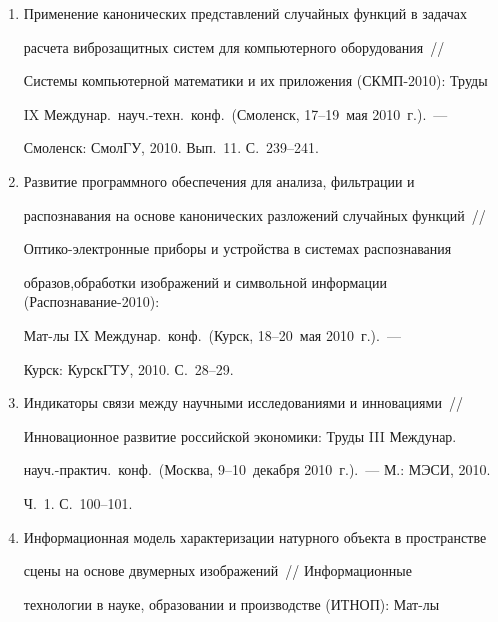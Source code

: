 \begin{enumerate}[1.]
ГЕОС, 2010. С.~495--498.


\item {}


Применение канонических представлений случайных функций в задачах 


расчета виброзащитных сис\-тем для компьютерного оборудования~/\!\!/  


Сис\-те\-мы компьютерной математики и их приложения (СКМП-2010): Труды 


IX Междунар.\ науч.-техн.\ конф.\ (Смоленск, 17--19~мая 2010~г.).~--- 


Смоленск: СмолГУ, 2010. Вып.~11. С.~239--241.


\item {}


Развитие программного обеспечения для анализа, фильтрации и 


распознавания на основе канонических разложений случайных функций~/\!\!/  


Оптико-электронные приборы и устройства в сис\-темах распознавания 


образов,\linebreak обработки изображений и символьной информации (Распознавание-2010): 


Мат-лы IX Междунар.\ конф.\ (Курск, 18--20~мая 2010~г.).~--- 


Курск: \mbox{КурскГТУ}, 2010. С.~28--29.








\item {}


Индикаторы связи между научными исследованиями и инновациями~/\!\!/  


Инновационное развитие российской экономики: Труды III Междунар.\ 


науч.-практич.\ конф.\  (Москва, 9--10~декабря 2010~г.).~--- М.: МЭСИ, 2010. 


Ч.~1. С.~100--101.


\item {}


Информационная модель характеризации натурного объекта в пространстве 


сцены на основе двумерных изображений~/\!\!/  Информационные 


технологии в науке, образовании и производстве (ИТНОП): Мат-лы 



\end{enumerate}
